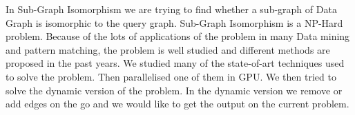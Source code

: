 \abstract


\vspace*{24pt}
\hspace{10mm}In Sub-Graph Isomorphism we are trying to find whether a sub-graph of Data Graph is isomorphic to the query graph. Sub-Graph Isomorphism is a NP-Hard problem. Because of the lots of applications of the problem in many Data mining and pattern matching, the problem is well studied and different methods are proposed in the past years. We studied many of the state-of-art techniques used to solve the problem. Then parallelised one of them in GPU. We then tried to solve the dynamic version of the problem. In the dynamic version we remove or add edges on the go and we would like to get the output on the current problem.
\pagebreak